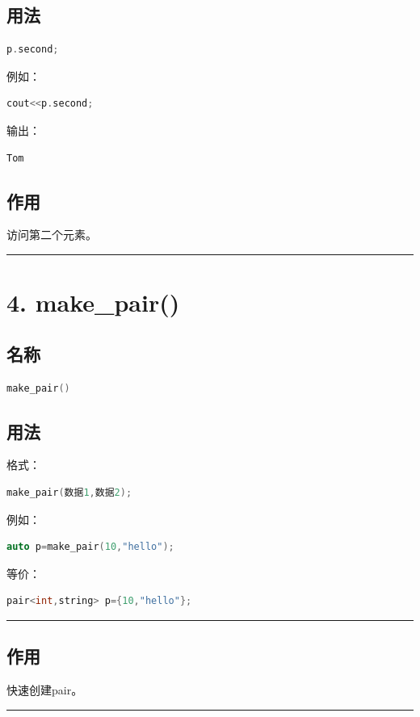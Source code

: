 \documentclass[10pt,twocolumn]{extarticle}
\begin{document}
\subsection{用法}
\begin{lstlisting}[language=C++]
p.second;
\end{lstlisting}
例如：
\begin{lstlisting}[language=C++]
cout<<p.second;
\end{lstlisting}
输出：
\begin{lstlisting}
Tom
\end{lstlisting}

\subsection{作用}
访问第二个元素。

\noindent\rule{\linewidth}{0.4pt}

\section{4. make\_pair()}

\subsection{名称}
\begin{lstlisting}[language=C++]
make_pair()
\end{lstlisting}

\subsection{用法}
格式：
\begin{lstlisting}[language=C++]
make_pair(数据1,数据2);
\end{lstlisting}
例如：
\begin{lstlisting}[language=C++]
auto p=make_pair(10,"hello");
\end{lstlisting}
等价：
\begin{lstlisting}[language=C++]
pair<int,string> p={10,"hello"};
\end{lstlisting}

\noindent\rule{\linewidth}{0.4pt}

\subsection{作用}
快速创建pair。

\noindent\rule{\linewidth}{0.4pt}
\end{document}
